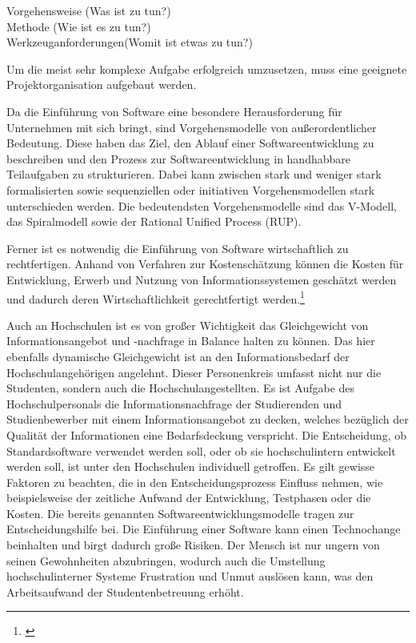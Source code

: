 Vorgehensweise (Was ist zu tun?)\\
Methode (Wie ist es zu tun?)\\
Werkzeuganforderungen(Womit ist etwas zu tun?)

Um die meist sehr komplexe Aufgabe erfolgreich umzusetzen, muss eine geeignete Projektorganisation aufgebaut werden.

Da die Einführung von Software eine besondere Herausforderung für Unternehmen mit sich bringt, sind Vorgehensmodelle von außerordentlicher Bedeutung. 
Diese haben das Ziel, den Ablauf einer Softwareentwicklung zu beschreiben und den Prozess zur Softwareentwicklung in handhabbare Teilaufgaben zu strukturieren. 
Dabei kann zwischen stark und weniger stark formalisierten sowie sequenziellen oder initiativen Vorgehensmodellen stark unterschieden werden. 
Die bedeutendsten Vorgehensmodelle sind das V-Modell, das Spiralmodell sowie der Rational Unified Process (RUP).

Ferner ist es notwendig die Einführung von Software wirtschaftlich zu rechtfertigen. Anhand von Verfahren zur Kostenschätzung können die Kosten für Entwicklung, Erwerb und Nutzung von Informationssystemen geschätzt werden und dadurch deren Wirtschaftlichkeit gerechtfertigt werden.\footnote{\cite{krcmar_einfuhrung_2015}}

Auch an Hochschulen ist es von großer Wichtigkeit das Gleichgewicht von Informationsangebot und -nachfrage in Balance halten zu können. 
Das hier ebenfalls dynamische Gleichgewicht ist an den Informationsbedarf der Hochschulangehörigen angelehnt. 
Dieser Personenkreis umfasst nicht nur die Studenten, sondern auch die Hochschulangestellten. 
Es ist Aufgabe des Hochschulpersonals die Informationsnachfrage der Studierenden und Studienbewerber mit einem Informationsangebot zu decken, welches bezüglich der Qualität der Informationen eine Bedarfsdeckung verspricht. 
Die Entscheidung, ob Standardsoftware verwendet werden soll, oder ob sie hochschulintern entwickelt werden soll, ist unter den Hochschulen individuell getroffen. 
Es gilt gewisse Faktoren zu beachten, die in den Entscheidungsprozess Einfluss nehmen, wie beispielsweise der zeitliche Aufwand der Entwicklung, Testphasen oder die Kosten. 
Die bereits genannten Softwareentwicklungsmodelle tragen zur Entscheidungshilfe bei.
Die Einführung einer Software kann einen Technochange beinhalten und birgt dadurch große Risiken. 
Der Mensch ist nur ungern von seinen Gewohnheiten abzubringen, wodurch auch die Umstellung hochschulinterner Systeme Frustration und Unmut auslösen kann, was den Arbeitsaufwand der Studentenbetreuung erhöht.

